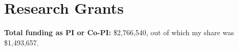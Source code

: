 
\section{Research Grants}

{\bf Total funding as PI or Co-PI:} \$2,766,540, out of which my share was \$1,493,657.
\toconfirm{} %


